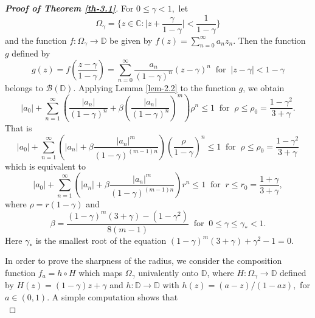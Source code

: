 \documentclass[a4paper,12pt]{amsart}
\theoremstyle{plain}
\theoremstyle{definition}
\begin{document}
\begin{proof}[\bf Proof of Theorem \ref{th-3.1}]
	For $ 0\leq \gamma<1, $ let 
	\begin{equation*}
		\Omega_{\gamma}=\bigg\{z\in\mathbb{C} : \bigg|z+\frac{\gamma}{1-\gamma}\bigg|<\frac{1}{1-\gamma}\bigg\}
	\end{equation*} and the function $ f : \Omega_{\gamma}\rightarrow\mathbb{D} $ be given by $f(z)=\sum_{n=0}^{\infty} a_{n}z_{n}$. Then the function $ g $ defined by 
\begin{equation*}
	g(z)=f\left(\frac{z-\gamma}{1-\gamma}\right)=\sum_{n=0}^{\infty}\frac{a_n}{(1-\gamma)^n}(z-\gamma)^n\;\;\text{for}\;\; |z-\gamma|<1-\gamma
\end{equation*}
belongs to $ \mathcal{B}(\mathbb{D}) $. Applying Lemma \ref{lem-2.2} to the function $ g $, we obtain
	\begin{equation*}
	|a_0|+\sum_{n=1}^{\infty}\left(\frac{|a_n|}{(1-\gamma)^n}+\beta\left(\frac{|a_n|}{(1-\gamma)^n}\right)^m\right)\rho^n\leq 1\;\; \text{for}\;\; \rho\leq \rho_0=\frac{1-\gamma^2}{3+\gamma}.
	\end{equation*}
 That is 
 \begin{equation*}
 	|a_0|+\sum_{n=1}^{\infty}\left(|a_n|+\beta\frac{|a_n|^m}{(1-\gamma)^{(m-1)n}}\right)\left(\frac{\rho}{1-\gamma}\right)^n\leq 1\;\; \text{for}\;\; \rho\leq \rho_0=\frac{1-\gamma^2}{3+\gamma}
 \end{equation*} 
which is equivalent to 
\begin{equation*}
	|a_0|+\sum_{n=1}^{\infty}\left(|a_n|+\beta\frac{|a_n|^m}{(1-\gamma)^{(m-1)n}}\right)r^n\leq 1\;\; \text{for}\;\; r\leq r_0=\frac{1+\gamma}{3+\gamma},
\end{equation*}
where $ \rho=r(1-\gamma) $ and
\begin{equation*}
	\beta=\frac{(1-\gamma)^m(3+\gamma)-(1-\gamma^2)}{8(m-1)}\;\; \text{for}\;\; 0\leq \gamma\leq\gamma_*<1.
\end{equation*} Here $ \gamma_* $ is the smallest root of the equation $ (1-\gamma)^m(3+\gamma)+\gamma^2-1=0. $ \\[0.6mm] \par
In order to prove the sharpness of the radius, we consider the composition function $ f_{a}=h\circ H $ which maps $ \Omega_{\gamma} $ univalently onto $\mathbb{D}$, where $ H : \Omega_{\gamma}\rightarrow\mathbb{D} $ defined by $ H(z)= (1-\gamma)z+\gamma $ and $ h : \mathbb{D}\rightarrow\mathbb{D} $ with $ h(z)=(a-z)/(1-az), $ for $ a\in (0,1) $. A simple computation shows that 
\begin{equation*}

\end{equation*}
\end{proof}
\end{document}
